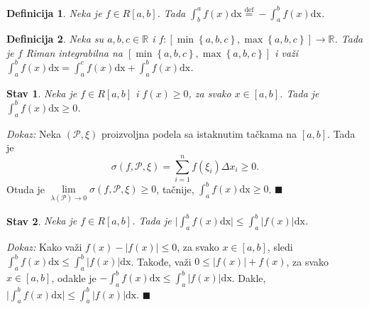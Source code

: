 \documentclass{article}
\newtheorem{definicija}{Definicija}[section]
\newtheorem{stav}{Stav}[section]
\begin{document}
\begin{defbox}
    \label{definicija_2.11}
    \begin{definicija}
        Neka je $f \in R\left[a, b\right]$. Tada $\displaystyle\int^a_b f\left(x\right)\text{dx} \overset{\text{def}}{=} -\int^b_a f\left(x\right)\text{dx}$.
    \end{definicija}
\end{defbox}

\begin{defbox}
    \label{definicija_2.12}
    \begin{definicija} Neka su $a, b, c \in \mathbb{R}$ i $f:\left[\min\left\{a, b, c\right\}, \max\left\{a, b, c\right\}\right] \longrightarrow \mathbb{R}$. Tada je
        $f$ Riman integrabilna na $\left[\min\left\{a, b, c\right\}, \max\left\{a, b, c\right\}\right]$ i važi
        $\displaystyle \int^b_a f\left(x\right)\text{dx} = \int^c_a f\left(x\right)\text{dx} + \int^b_a f\left(x\right) \text{dx}$.
    \end{definicija}
\end{defbox}

\begin{stavbox}
    \label{stav_2.8}
    \begin{stav}
        Neka je $f \in R\left[a,b\right]$ i $f\left(x\right) \geq 0$, za svako $x \in \left[a,b\right]$. Tada je $\displaystyle \int^b_a f\left(x\right)\text{dx} \geq 0$.
    \end{stav}
\end{stavbox}

\textit{Dokaz:} Neka $\left(\mathcal{P}, \xi\right)$ proizvoljna podela sa istaknutim tačkama na
$\left[a, b\right]$. Tada je
$$\sigma\left(f, \mathcal{P}, \xi\right) = \displaystyle \sum^n_{i=1}f\left(\xi_i\right)\Delta x_i \geq 0.$$
Otuda je $\displaystyle \lim\limits_{\lambda\left(\mathcal{P}\right)\longrightarrow 0} \sigma \left(f, \mathcal{P}, \xi\right) \geq 0$, tačnije, $\displaystyle \int^b_a f\left(x\right)\text{dx} \geq 0$.
\null\hfill $\blacksquare$\par

\begin{stavbox}
    \label{stav_2.9}
    \begin{stav}
        Neka je $f \in R\left[a, b\right]$. Tada je $\displaystyle \bigg|\int^b_a f\left(x\right)\text{dx}\bigg| \leq \int^b_a\big|f\left(x\right)\big|\text{dx}$.
    \end{stav}
\end{stavbox}

\textit{Dokaz:} Kako važi $f\left(x\right) - |f\left(x\right)| \leq 0$, za svako $x\in \left[a, b\right]$, sledi $\displaystyle \int^b_a f\left(x\right)\text{dx} \leq \int^b_a |f\left(x\right)|\text{dx}$.
Takođe, važi $0\leq|f\left(x\right)| + f\left(x\right)$, za svako $x\in \left[a, b\right]$, odakle je $\displaystyle -\int^b_a f\left(x\right)\text{dx} \leq \int^b_a |f\left(x\right)|\text{dx}$.
Dakle, $\displaystyle \bigg|\int^b_a f\left(x\right)\text{dx}\bigg| \leq \int^b_a\big|f\left(x\right)\big|\text{dx}$.
\null\hfill $\blacksquare$\par
\end{document}
